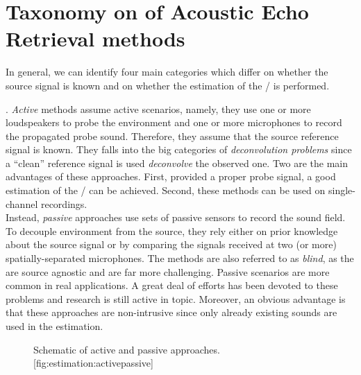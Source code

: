 \section{Taxonomy on of Acoustic Echo Retrieval methods}\label{sec:estimation:taxonomy}

In general, we can identify four main categories which differ on whether the source signal is known and on whether the estimation of the \RIR/ is performed.

.
\textit{Active} methods assume active scenarios, namely, they use one or more loudspeakers to probe the environment and one or more microphones to record the propagated probe sound.
Therefore, they assume that the source reference signal is known.
They falls into the big categories of \textit{deconvolution problems} since a ``clean'' reference signal is used \textit{deconvolve} the observed one.
Two are the main advantages of these approaches.
First, provided a proper probe signal, a good estimation of the \RIR/ can be achieved.
Second, these methods can be used on single-channel recordings.
\\Instead, \textit{passive} approaches use sets of passive sensors to record the sound field.
To decouple environment from the source, they rely either on prior knowledge about the source signal or by comparing the signals received at two (or more) spatially-separated microphones.
The methods are also referred to as \textit{blind}, as the are source agnostic and are far more challenging.
Passive scenarios are more common in real applications.
A great deal of efforts has been devoted to these problems and research is still active in topic.
Moreover, an obvious advantage is that these approaches are non-intrusive since only already existing sounds are used in the estimation.

\begin{figure}[h]
    \begin{sidecaption}{%
        Schematic of active and passive approaches.
    }[fig:estimation:activepassive]
    \centering
    \resizebox{\linewidth}{!}{
        
    }
    \end{sidecaption}
\end{figure}

